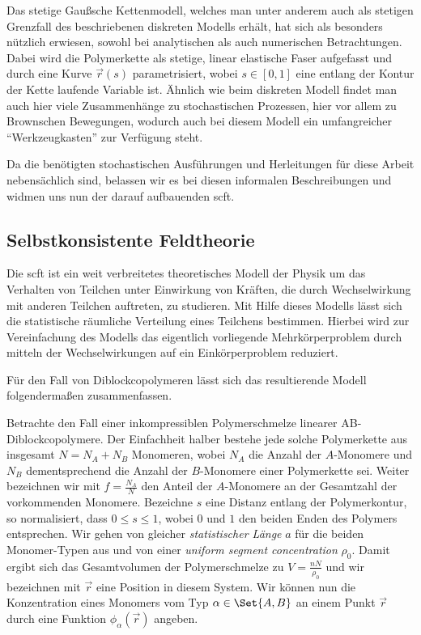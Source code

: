 Das stetige Gaußsche Kettenmodell, welches man unter anderem auch als stetigen Grenzfall des beschriebenen diskreten Modells erhält, hat sich als besonders nützlich erwiesen, sowohl bei analytischen als auch numerischen Betrachtungen.
Dabei wird die Polymerkette als stetige, linear elastische Faser aufgefasst und durch eine Kurve $\vec{r}(s)$ parametrisiert, wobei $s \in [0, 1]$ eine entlang der Kontur der Kette laufende Variable ist.
Ähnlich wie beim diskreten Modell findet man auch hier viele Zusammenhänge zu stochastischen Prozessen, hier vor allem zu Brownschen Bewegungen,
wodurch auch bei diesem Modell ein umfangreicher \enquote{Werkzeugkasten} zur Verfügung steht.

Da die benötigten stochastischen Ausführungen und Herleitungen für diese Arbeit nebensächlich sind, belassen wir es bei diesen informalen Beschreibungen und widmen uns nun der darauf aufbauenden \ac{scft}.

\subsection*{Selbstkonsistente Feldtheorie} %
\label{par:self_consistent_field_theory}

Die \acl{scft} ist ein weit verbreitetes theoretisches Modell der Physik um das Verhalten von Teilchen unter Einwirkung von Kräften, die durch Wechselwirkung mit anderen Teilchen auftreten, zu studieren.
Mit Hilfe dieses Modells lässt sich die statistische räumliche Verteilung eines Teilchens bestimmen.
Hierbei wird zur Vereinfachung des Modells das eigentlich vorliegende Mehrkörperproblem durch mitteln der Wechselwirkungen auf ein Einkörperproblem reduziert.

Für den Fall von Diblockcopolymeren lässt sich das resultierende Modell folgendermaßen zusammenfassen.

Betrachte den Fall einer inkompressiblen Polymerschmelze linearer AB-Diblockcopolymere.
Der Einfachheit halber bestehe jede solche Polymerkette aus insgesamt $N = N_{A} + N_{B}$ Monomeren, wobei $N_{A}$ die Anzahl der $A$-Monomere und $N_{B}$ dementsprechend die Anzahl der $B$-Monomere einer Polymerkette sei.
Weiter bezeichnen wir mit $f = \frac{N_{A}}{N}$ den Anteil der $A$-Monomere an der Gesamtzahl der vorkommenden Monomere.
Bezeichne $s$ eine Distanz entlang der Polymerkontur, so normalisiert, dass $0 \leq s \leq 1$, wobei $0$ und $1$ den beiden Enden des Polymers entsprechen.
Wir gehen von gleicher \emph{statistischer Länge} $a$ für die beiden Monomer-Typen aus und von einer \emph{uniform segment concentration} $\rho_{0}$.
Damit ergibt sich das Gesamtvolumen der Polymerschmelze zu $V = \frac{nN}{\rho_{0}}$ und wir bezeichnen mit $\vec{r}$ eine Position in diesem System.
Wir können nun die Konzentration eines Monomers vom Typ $\alpha \in \Set{A, B}$ an einem Punkt $\vec{r}$ durch eine Funktion $\phi_{\alpha}(\vec{r})$ angeben.

